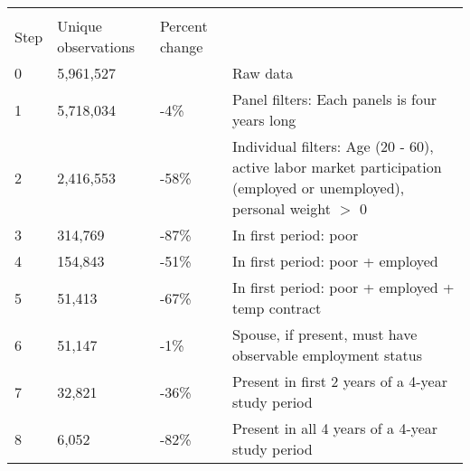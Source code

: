 \begin{tabular}{lll>{\raggedright\arraybackslash}p{4in}}
   \\[-1.8ex]\hline\hline \\ 
 [-1.8ex]
\multicolumn{1}{l}{Step} & 
\multicolumn{1}{l}{Unique observations} &
\multicolumn{1}{l}{Percent change} & 
\multicolumn{1}{l}{Notes} 
\\  
 
 \hline
0 & 5,961,527 &  & Raw data \\ 
  1 & 5,718,034 & -4\% & Panel filters: Each panels is four years long \\ 
  2 & 2,416,553 & -58\% & Individual filters: Age (20 - 60), active labor market participation (employed or unemployed), personal weight $>$ 0 \\ 
  3 & 314,769 & -87\% & In first period: poor \\ 
  4 & 154,843 & -51\% & In first period: poor + employed \\ 
  5 & 51,413 & -67\% & In first period: poor + employed + temp contract \\ 
  6 & 51,147 & -1\% & Spouse, if present, must have observable employment status \\ 
  7 & 32,821 & -36\% & Present in first 2 years of a 4-year study period \\ 
  8 & 6,052 & -82\% & Present in all 4 years of a 4-year study period \\ 
   \hline 
\end{tabular}
